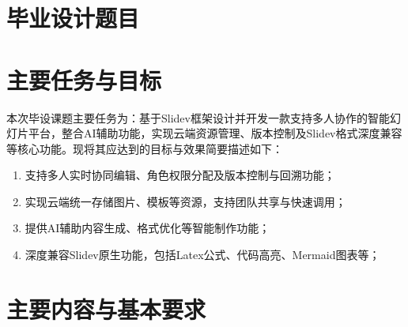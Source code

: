 \section{毕业设计题目}

\makeatletter
\@title %
\makeatother

\section{主要任务与目标}

本次毕设课题主要任务为：基于Slidev框架设计并开发一款支持多人协作的智能幻灯片平台，整合AI辅助功能，实现云端资源管理、版本控制及Slidev格式深度兼容等核心功能。现将其应达到的目标与效果简要描述如下：
\begin{enumerate}
    \item 支持多人实时协同编辑、角色权限分配及版本控制与回溯功能；
    \item 实现云端统一存储图片、模板等资源，支持团队共享与快速调用；
    \item 提供AI辅助内容生成、格式优化等智能制作功能；
    \item 深度兼容Slidev原生功能，包括Latex公式、代码高亮、Mermaid图表等；
\end{enumerate}

\section{主要内容与基本要求}

